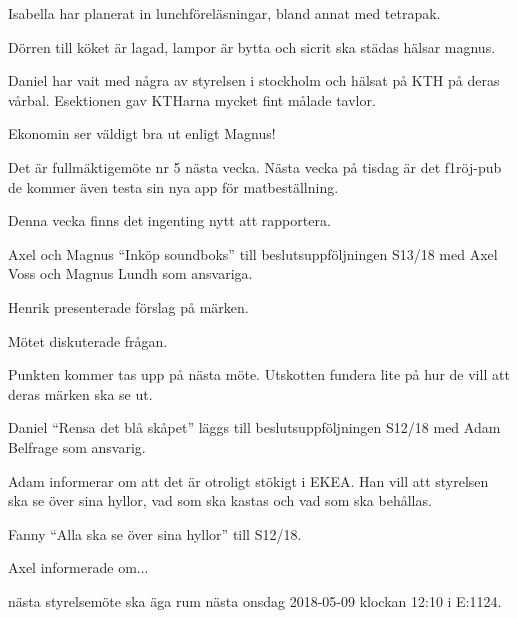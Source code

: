 \documentclass[10pt]{article}
\begin{document}
\begin{paragrafer}
\begin{paragrafer}
		Isabella har planerat in lunchföreläsningar, bland annat med tetrapak.

		Dörren till köket är lagad, lampor är bytta och sicrit ska städas hälsar magnus. 

		Daniel har vait med några av styrelsen i stockholm och hälsat på KTH på deras vårbal. Esektionen gav KTHarna mycket fint målade tavlor.

		Ekonomin ser väldigt bra ut enligt Magnus!
		
		
		Det är fullmäktigemöte nr 5 nästa vecka. Nästa vecka på tisdag är det f1röj-pub de kommer även testa sin nya app för matbeställning. 
		
		
		Denna vecka finns det ingenting nytt att rapportera.
		
		
	\end{paragrafer}
	
		
		Axel och Magnus \ypa ``Inköp soundboks'' till beslutsuppföljningen S13/18 med Axel Voss och Magnus Lundh som ansvariga.  

		\Mbaby


		Henrik presenterade förslag på märken.

		Mötet diskuterade frågan.

		Punkten kommer tas upp på nästa möte. Utskotten fundera lite på hur de vill att deras märken ska se ut.

	
		Daniel \ypa ``Rensa det blå skåpet'' läggs till beslutsuppföljningen S12/18 med Adam Belfrage som ansvarig.

  
		Adam informerar om att det är otroligt stökigt i EKEA. Han vill att styrelsen ska se över sina hyllor, vad som ska kastas och vad som ska behållas. 

		Fanny \ypa ``Alla ska se över sina hyllor'' till S12/18.

		\Mbaby

	
		Axel informerade om...

	\Mba nästa styrelsemöte ska äga rum nästa onsdag 2018-05-09 klockan 12:10 i E:1124.
	  

\end{paragrafer}
\end{document}
